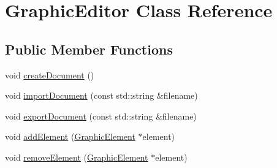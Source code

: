 \hypertarget{class_graphic_editor}{\section{Graphic\-Editor Class Reference}
\label{class_graphic_editor}
}
\subsection*{Public Member Functions}
\begin{DoxyCompactItemize}
\item 
void \hyperlink{class_graphic_editor_a2a9ae27cefa241552c07bdbe39c8137b}{create\-Document} ()
\item 
void \hyperlink{class_graphic_editor_ad6cdff6bb334234610633529cb1e42f3}{import\-Document} (const std\-::string \&filename)
\item 
void \hyperlink{class_graphic_editor_a343385644b2f62c677285758f96086b3}{export\-Document} (const std\-::string \&filename)
\item 
void \hyperlink{class_graphic_editor_afc79eea9f8377959bc8be03d992be780}{add\-Element} (\hyperlink{class_graphic_element}{Graphic\-Element} $\ast$element)
\item 
void \hyperlink{class_graphic_editor_a27150d582800a620ada5e0c42f6dba43}{remove\-Element} (\hyperlink{class_graphic_element}{Graphic\-Element} $\ast$element)
\end{DoxyCompactItemize}


